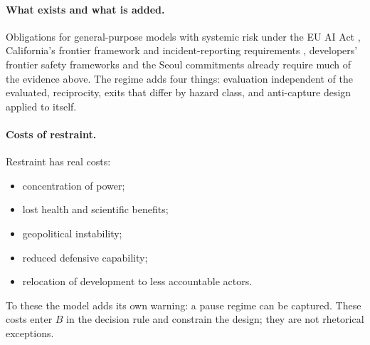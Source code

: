 \documentclass[11pt]{article}
\theoremstyle{plain}
\theoremstyle{definition}
\begin{document}
\paragraph{What exists and what is added.} Obligations for general-purpose models with systemic risk under the EU AI Act \citep{euaiact2024,eucop2025}, California's frontier framework and incident-reporting requirements \citep{sb53}, developers' frontier safety frameworks and the Seoul commitments already require much of the evidence above. The regime adds four things: evaluation independent of the evaluated, reciprocity, exits that differ by hazard class, and anti-capture design applied to itself.

\paragraph{Costs of restraint.} Restraint has real costs:
\begin{itemize}[leftmargin=*]
\item concentration of power;
\item lost health and scientific benefits;
\item geopolitical instability;
\item reduced defensive capability;
\item relocation of development to less accountable actors.
\end{itemize}
To these the model adds its own warning: a pause regime can be captured. These costs enter $B$ in the decision rule and constrain the design; they are not rhetorical exceptions.
\end{document}
